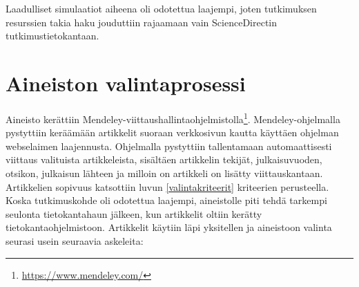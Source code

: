 \documentclass[utf8]{gradu3}
\begin{document}
\begin{table}[h]
\centering
{}
\caption{Hakutulosten määrä hakukohteista}
\label{table: hakutulokset}
\end{table}

Laadulliset simulaatiot aiheena oli odotettua laajempi, 
joten tutkimuksen resurssien takia haku jouduttiin rajaamaan 
vain ScienceDirectin tutkimustietokantaan.

\section{Aineiston valintaprosessi} \label{valintaprosessi}
Aineisto kerättiin Mendeley-viittaushallintaohjelmistolla\footnote{\url{https://www.mendeley.com/}}. Mendeley-ohjelmalla pystyttiin keräämään artikkelit suoraan verkkosivun kautta käyttäen ohjelman webselaimen laajennusta. Ohjelmalla pystyttiin tallentamaan automaattisesti viittaus valituista artikkeleista, sisältäen artikkelin tekijät, julkaisuvuoden, otsikon, julkaisun lähteen ja milloin on artikkeli on lisätty viittauskantaan. Artikkelien sopivuus katsottiin luvun \ref{valintakriteerit} kriteerien perusteella. 
Koska tutkimuskohde oli odotettua laajempi, 
aineistolle piti tehdä tarkempi seulonta tietokantahaun jälkeen, 
kun artikkelit oltiin kerätty tietokantaohjelmistoon. 
Artikkelit käytiin läpi yksitellen ja aineistoon valinta seurasi usein seuraavia askeleita:
\end{document}
